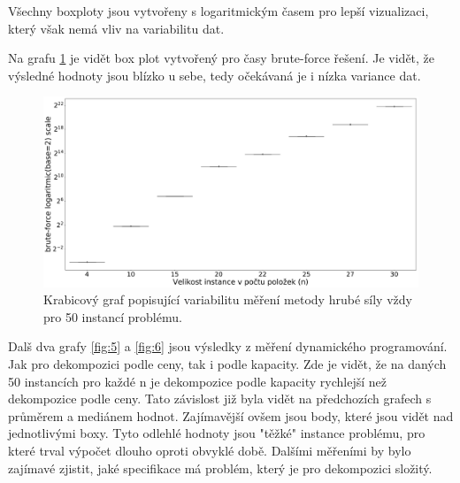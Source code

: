 \documentclass[11pt]{article}
\begin{document}
Všechny boxploty jsou vytvořeny s logaritmickým časem pro lepší vizualizaci, který však nemá vliv na variabilitu dat.

Na grafu \ref{fig:4} je vidět box plot vytvořený pro časy brute-force řešení. Je vidět, že výsledné hodnoty jsou blízko u sebe, tedy očekávaná je i nízka variance dat. 

\begin{figure}[h]\centering
	\includegraphics[scale=0.2]{img/boxB}
 	\caption[2]{Krabicový graf popisující variabilitu měření metody hrubé síly vždy pro 50 instancí problému.}\label{fig:4}
 \end{figure} 		

Dalš dva grafy \ref{fig:5} a \ref{fig:6} jsou výsledky z měření dynamického programování. Jak pro dekompozici podle ceny, tak i podle kapacity. Zde je vidět, že na daných 50 instancích pro každé n je dekompozice podle kapacity rychlejší než dekompozice podle ceny. Tato závislost již byla vidět na předchozích grafech s průměrem a mediánem hodnot. Zajímavější ovšem jsou body, které jsou vidět nad jednotlivými boxy. Tyto odlehlé hodnoty jsou "těžké" instance problému, pro které trval výpočet dlouho oproti obvyklé době. Dalšími měřeními by bylo zajímavé zjistit, jaké specifikace má problém, který je pro dekompozici složitý.
\end{document}
